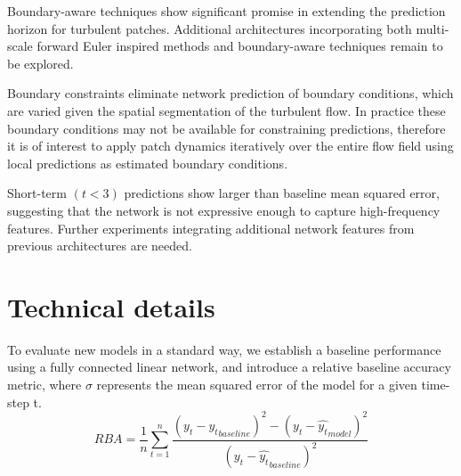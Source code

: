 \documentclass[12pt]{article}
\theoremstyle{plain}
\theoremstyle{remark}
\theoremstyle{definition}
\begin{document}
\noindent Boundary-aware techniques show significant promise in extending the prediction horizon for turbulent patches. Additional architectures incorporating both multi-scale forward Euler inspired methods and boundary-aware techniques remain to be explored.

\noindent Boundary constraints eliminate network prediction of boundary conditions, which are varied given the spatial segmentation of the turbulent flow. In practice these boundary conditions may not be available for constraining predictions, therefore it is of interest to apply patch dynamics iteratively over the entire flow field using local predictions as estimated boundary conditions.

\noindent Short-term $(t < 3)$ predictions show larger than baseline mean squared error, suggesting that the network is not expressive enough to capture high-frequency features. Further experiments integrating additional network features from previous architectures are needed.


\section{Technical details}

To evaluate new models in a standard way, we establish a baseline performance using a fully connected linear network, and introduce a relative baseline accuracy metric, where $\sigma$ represents the mean squared error of the model for a given time-step t.
$$RBA =  \frac{1}{n}\sum_{t=1}^{n}\frac{(y_t - \hat{y_t}_{baseline})^2 -(y_t - \hat{y_t}_{model})^2}{ (y_t - \hat{y_t}_{baseline})^2}$$ 
\end{document}
